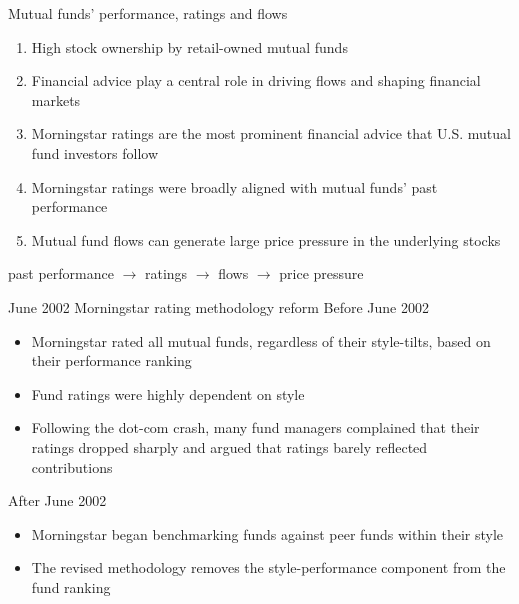 \documentclass[UTF8, 16pt]{beamer}
\begin{document}
\begin{CJK*}{UTF8}{gbsn}
\begin{frame}{Mutual funds' performance, ratings and flows}
	\begin{enumerate}
		\item High stock ownership by \alert{retail-owned mutual funds}
		\item \alert{Financial advice} play a central role in  \alert{driving flows} and shaping financial markets
		\item \alert{Morningstar ratings} are the most prominent financial advice that U.S. mutual fund investors follow
		\item Morningstar ratings were broadly aligned with mutual funds’ \alert{past performance}
		\item Mutual fund flows can generate large \alert{price pressure} in the underlying stocks
	\end{enumerate}
	\center past performance $\rightarrow$ ratings $\rightarrow$ flows $\rightarrow$ price pressure
\end{frame}

\begin{frame}{June 2002 Morningstar rating methodology reform}
	\alert{Before} June 2002
	\begin{itemize}
		\item Morningstar rated all mutual funds, \alert{regardless of their style-tilts}, based on their performance ranking
		\item Fund ratings were highly dependent on style
		\item Following the \alert{dot-com crash}, many fund managers complained that their ratings dropped sharply and argued that ratings barely reflected  contributions
	\end{itemize}
	\alert{After} June 2002
	\begin{itemize}
		\item Morningstar began benchmarking funds against peer funds \alert{within their style}
		\item The revised methodology removes the style-performance component from the fund ranking
	\end{itemize}
\end{frame}


\end{CJK*}
\end{document}
